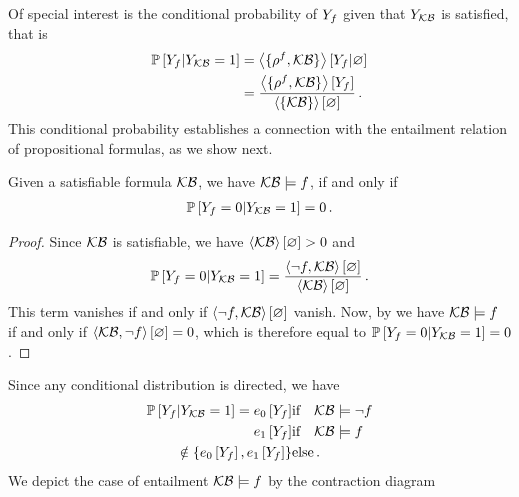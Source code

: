 % 
Of special interest is the conditional probability of $Y_{f}$ given that $Y_{\mathcal{KB}}$ is satisfied, that is
\begin{align*}
	\mathbb{P}\left[Y_{f}|Y_{\mathcal{KB}}=1\right] 
	& = \left\langle \{\rho^{f} ,\mathcal{KB}\}\right\rangle \left[ Y_{f} | \varnothing \right]\\
	& = \frac{\left\langle \{\rho^{f},\mathcal{KB}\}\right\rangle \left[ Y_{f} \right]}{\left\langle \{\mathcal{KB}\}\right\rangle \left[ \varnothing \right]} \, . 
\end{align*}
This conditional probability establishes a connection with the entailment relation of propositional formulas, as we show next.

%
\begin{theorem}\label{the:probEntailment}
	Given a satisfiable formula $\mathcal{KB}$, we have $\mathcal{KB}\models f$, if and only if
	\begin{align*}
		\mathbb{P}\left[Y_{f}=0|Y_{\mathcal{KB}}=1\right] = 0 \, .
	\end{align*}
\end{theorem}
\begin{proof}
	Since $\mathcal{KB}$ is satisfiable, we have $\left\langle \mathcal{KB}\right\rangle \left[ \varnothing \right]>0$ and
		\[ \mathbb{P}\left[Y_{f}=0|Y_{\mathcal{KB}}=1\right] = \frac{\left\langle \lnot f,\mathcal{KB}\right\rangle \left[ \varnothing \right]}{\left\langle \mathcal{KB}\right\rangle \left[ \varnothing \right]} \, .  \]
	This term vanishes if and only if $\left\langle \lnot f,\mathcal{KB}\right\rangle \left[ \varnothing \right]$ vanish.
	Now, by  we have $\mathcal{KB}\models f$ if and only if $\left\langle \mathcal{KB},\lnot f\right\rangle \left[ \varnothing \right]=0$, which is therefore equal to $\mathbb{P}\left[Y_{f}=0|Y_{\mathcal{KB}}=1\right]=0$.
\end{proof}

Since any conditional distribution is directed, we have
\begin{align}
	\condprobof{\formulavar}{\kbvar=1} = %
	\fbasisat{\formulavar}  & \text{if} \quad \kb\models\lnot\exformula \\
	\tbasisat{\formulavar}  & \text{if} \quad \kb\models\exformula \\
	\notin \{\fbasisat{\formulavar},\tbasisat{\formulavar}\} & \text{else}
	\, .
\end{align}
We depict the case of entailment $\mathcal{KB}\models f$ by the contraction diagram
\begin{center}
	
\end{center}

